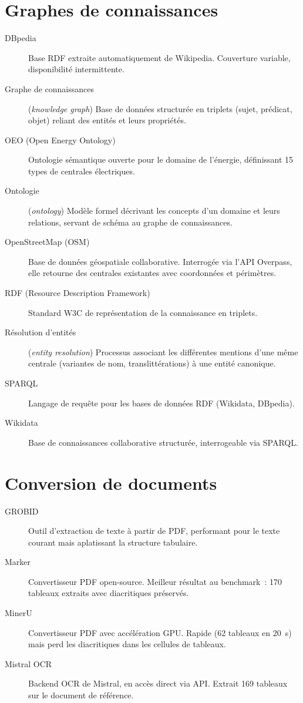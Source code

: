 \section*{Graphes de connaissances}

\begin{description}
\item[DBpedia] Base RDF extraite automatiquement de Wikipedia. Couverture variable, disponibilité intermittente.
\item[Graphe de connaissances] (\emph{knowledge graph}) Base de données structurée en triplets (sujet, prédicat, objet) reliant des entités et leurs propriétés.
\item[OEO (Open Energy Ontology)] Ontologie sémantique ouverte pour le domaine de l'énergie, définissant 15 types de centrales électriques.
\item[Ontologie] (\emph{ontology}) Modèle formel décrivant les concepts d'un domaine et leurs relations, servant de schéma au graphe de connaissances.
\item[OpenStreetMap (OSM)] Base de données géospatiale collaborative. Interrogée via l'API Overpass, elle retourne des centrales existantes avec coordonnées et périmètres.
\item[RDF (Resource Description Framework)] Standard W3C de représentation de la connaissance en triplets.
\item[Résolution d'entités] (\emph{entity resolution}) Processus associant les différentes mentions d'une même centrale (variantes de nom, translittérations) à une entité canonique.
\item[SPARQL] Langage de requête pour les bases de données RDF (Wikidata, DBpedia).
\item[Wikidata] Base de connaissances collaborative structurée, interrogeable via SPARQL.
\end{description}

\section*{Conversion de documents}

\begin{description}
\item[GROBID] Outil d'extraction de texte à partir de PDF, performant pour le texte courant mais aplatissant la structure tabulaire.
\item[Marker] Convertisseur PDF open-source. Meilleur résultat au benchmark~: 170 tableaux extraits avec diacritiques préservés.
\item[MinerU] Convertisseur PDF avec accélération GPU. Rapide (62 tableaux en 20~s) mais perd les diacritiques dans les cellules de tableaux.
\item[Mistral OCR] Backend OCR de Mistral, en accès direct via API. Extrait 169 tableaux sur le document de référence.
\end{description}

